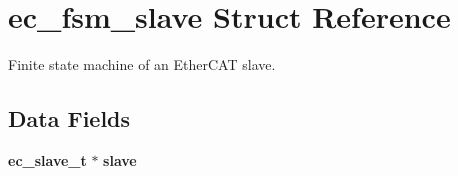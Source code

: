 \section{ec\-\_\-fsm\-\_\-slave \-Struct \-Reference}
\label{structec__fsm__slave}


\-Finite state machine of an \-Ether\-C\-A\-T slave.  


\subsection*{\-Data \-Fields}
\begin{DoxyCompactItemize}
\item 
{\bf ec\-\_\-slave\-\_\-t} $\ast$ {\bf slave}\label{structec__fsm__slave_aa94f51d82b6c14baa831f68999fbc6a7}


\end{DoxyCompactItemize}
